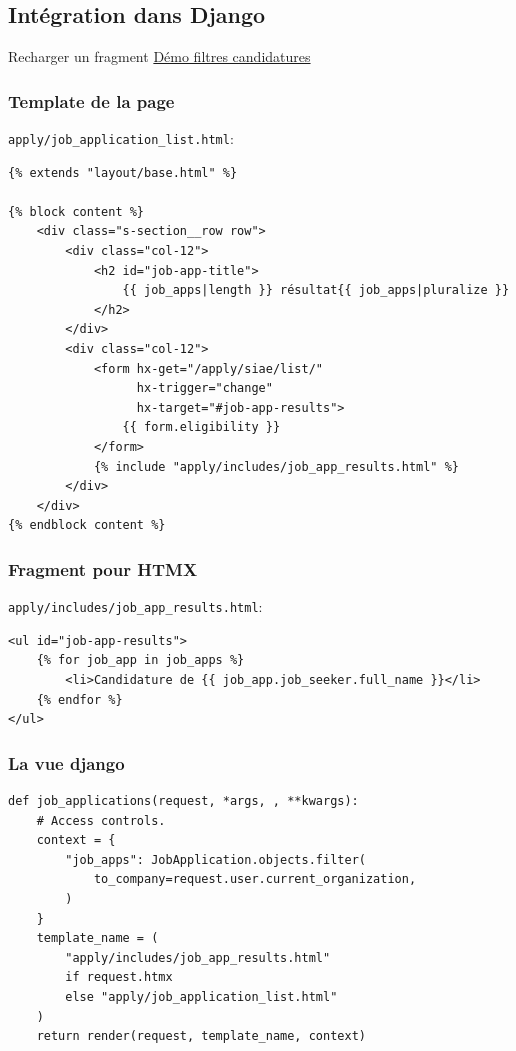 \documentclass{beamer}
\begin{document}
\subsection*{Intégration dans Django}

\begin{frame}{Recharger un fragment}
    \href{https://demo.emplois.inclusion.beta.gouv.fr/}{Démo filtres candidatures}
\end{frame}

\begin{frame}[fragile]
    \frametitle{Template de la page}

    \texttt{apply/job\_application\_list.html}:

    \begin{verbatim}
{% extends "layout/base.html" %}

{% block content %}
    <div class="s-section__row row">
        <div class="col-12">
            <h2 id="job-app-title">
                {{ job_apps|length }} résultat{{ job_apps|pluralize }}
            </h2>
        </div>
        <div class="col-12">
            <form hx-get="/apply/siae/list/"
                  hx-trigger="change"
                  hx-target="#job-app-results">
                {{ form.eligibility }}
            </form>
            {% include "apply/includes/job_app_results.html" %}
        </div>
    </div>
{% endblock content %}
    \end{verbatim}
\end{frame}

\begin{frame}[fragile]
    \frametitle{Fragment pour HTMX}

    \texttt{apply/includes/job\_app\_results.html}:
    \begin{verbatim}
<ul id="job-app-results">
    {% for job_app in job_apps %}
        <li>Candidature de {{ job_app.job_seeker.full_name }}</li>
    {% endfor %}
</ul>
    \end{verbatim}
\end{frame}

\begin{frame}[fragile]
    \frametitle{La vue django}

    \begin{verbatim}
def job_applications(request, *args, , **kwargs):
    # Access controls.
    context = {
        "job_apps": JobApplication.objects.filter(
            to_company=request.user.current_organization,
        )
    }
    template_name = (
        "apply/includes/job_app_results.html"
        if request.htmx
        else "apply/job_application_list.html"
    )
    return render(request, template_name, context)
    \end{verbatim}
\end{frame}
\end{document}
